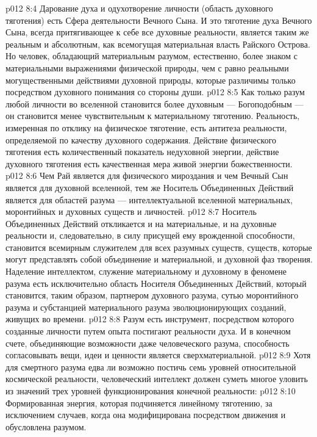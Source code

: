 \vs p012 8:4 \pc Дарование духа и одухотворение личности (область духовного тяготения) есть Сфера деятельности Вечного Сына. И это тяготение духа Вечного Сына, всегда притягивающее к себе все духовные реальности, является таким же реальным и абсолютным, как всемогущая материальная власть Райского Острова. Но человек, обладающий материальным разумом, естественно, более знаком с материальными выражениями физической природы, чем с равно реальными могущественными действиями духовной природы, которые различимы только посредством духовного понимания со стороны души.
\vs p012 8:5 Как только разум любой личности во вселенной становится более духовным --- Богоподобным --- он становится менее чувствительным к материальному тяготению. Реальность, измеренная по отклику на физическое тяготение, есть антитеза реальности, определяемой по качеству духовного содержания. Действие физического тяготения есть количественный показатель недуховной энергии, действие духовного тяготения есть качественная мера живой энергии божественности.
\vs p012 8:6 \pc Чем Рай является для физического мироздания и чем Вечный Сын является для духовной вселенной, тем же Носитель Объединенных Действий является для областей разума --- интеллектуальной вселенной материальных, моронтийных и духовных существ и личностей.
\vs p012 8:7 Носитель Объединенных Действий откликается и на материальные, и на духовные реальности и, следовательно, в силу присущей ему врожденной способности, становится всемирным служителем для всех разумных существ, существ, которые могут представлять собой объединение и материальной, и духовной фаз творения. Наделение интеллектом, служение материальному и духовному в феномене разума есть исключительно область Носителя Объединенных Действий, который становится, таким образом, партнером духовного разума, сутью моронтийного разума и субстанцией материального разума эволюционирующих созданий, живущих во времени.
\vs p012 8:8 Разум есть инструмент, посредством которого созданные личности путем опыта постигают реальности духа. И в конечном счете, объединяющие возможности даже человеческого разума, способность согласовывать вещи, идеи и ценности является сверхматериальной.
\vs p012 8:9 \pc Хотя для смертного разума едва ли возможно постичь семь уровней относительной космической реальности, человеческий интеллект должен суметь многое уловить из значений трех уровней функционирования конечной реальности:
\vs p012 8:10 \bibnobreakspace {} Формированная энергия, которая подчиняется линейному тяготению, за исключением случаев, когда она модифицирована посредством движения и обусловлена разумом.
